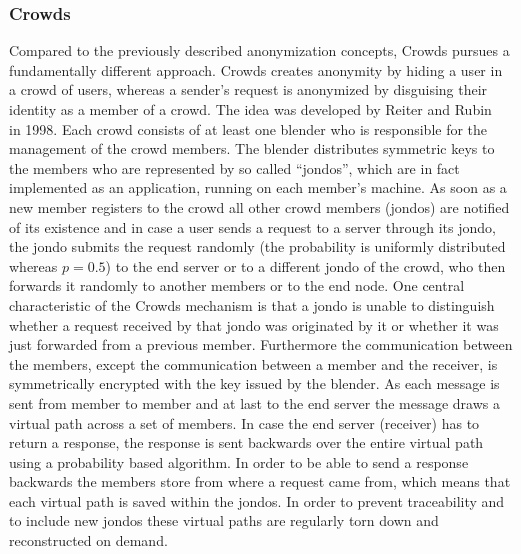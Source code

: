 \documentclass{sig-alternate}
\begin{document}
\subsubsection {Crowds}
Compared to the previously described anonymization concepts, Crowds pursues a fundamentally different approach. Crowds creates anonymity by hiding a user in a crowd of users, whereas a sender's request is anonymized by disguising their identity as a member of a crowd. The idea was developed by Reiter and Rubin~\cite{reiter1998crowds} in 1998. Each crowd consists of at least one blender who is responsible for the management of the crowd members. The blender distributes symmetric keys to the members who are represented by so called ``jondos'', which are in fact implemented as an application, running on each member's machine. As soon as a new member registers to the crowd all other crowd members (jondos) are notified of its existence and in case a user sends a request to a server through its jondo, the jondo submits the request randomly (the probability is uniformly distributed whereas $p = 0.5$) to the end server or to a different jondo of the crowd, who then forwards it randomly to another members or to the end node. One central characteristic of the Crowds mechanism is that a jondo is unable to distinguish whether a request received by that jondo was originated by it or whether it was just forwarded from a previous member. Furthermore the communication between the members, except the communication between a member and the receiver, is symmetrically encrypted with the key issued by the blender. As each message is sent from member to member and at last to the end server the message draws a virtual path across a set of members. In case the end server (receiver) has to return a response, the response is sent backwards over the entire virtual path using a probability based algorithm. In order to be able to send a response backwards the members store from where a request came from, which means that each virtual path is saved within the jondos. In order to prevent traceability and to include new jondos these virtual paths are regularly torn down and reconstructed on demand. 
\end{document}
